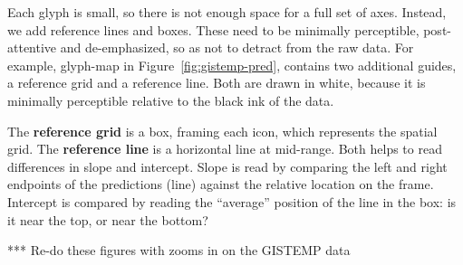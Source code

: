 \documentclass[oneside]{article}
\begin{document}
Each glyph is small, so there is not enough space for a full set of axes. Instead, we add reference lines and boxes. These need to be minimally perceptible, post-attentive \citep{healey} and de-emphasized, so as not to detract from the raw data. For example, glyph-map in Figure~\ref{fig:gistemp-pred}, contains two additional guides, a reference grid and a reference line. Both are drawn in white, because it is minimally perceptible relative to the black ink of the data.

The \textbf{reference grid} is a box, framing each icon, which represents the spatial grid. The \textbf{reference line} is a horizontal line at mid-range.  Both helps to read differences in slope and intercept. Slope is read by comparing the left and right endpoints of the predictions (line) against the relative location on the frame. Intercept is compared by reading the ``average'' position of the line in the box: is it near the top, or near the bottom? 




*** Re-do these figures with zooms in on the GISTEMP data
\end{document}
